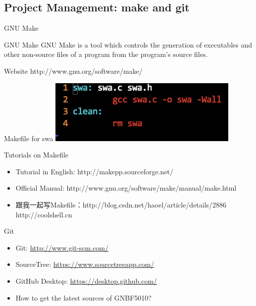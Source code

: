 \documentclass[UTF8]{beamer}
\begin{document}
\subsection{Project Management: make and git}

\begin{frame}[t]{GNU Make}
\begin{block}{GNU Make}
  GNU Make is a tool which controls the generation of executables and other
  non-source files of a program from the program's source files.
\end{block}
\begin{block}{Website}
  http://www.gnu.org/software/make/
\end{block}
\end{frame}

\begin{frame}[t]{Makefile for swa}
\includegraphics[width=\textwidth]{swamakefile.png}
\end{frame}

\begin{frame}[t]{Tutorials on Makefile}
\begin{itemize}
  \item Tutorial in English: http://makepp.sourceforge.net/
  \item Official Manual: http://www.gnu.org/software/make/manual/make.html
  \item 跟我一起写Makefile：http://blog.csdn.net/haoel/article/details/2886\\
  http://coolshell.cn
\end{itemize}
\end{frame}

\begin{frame}[t]{Git}
    \begin{itemize}
        \item Git: \url{http://www.git-scm.com/}
        \item SourceTree: \url{https://www.sourcetreeapp.com/}
        \item GitHub Desktop: \url{https://desktop.github.com/}
        \item How to get the latest sources of GNBF5010?
    \end{itemize}
\end{frame}
\end{document}
